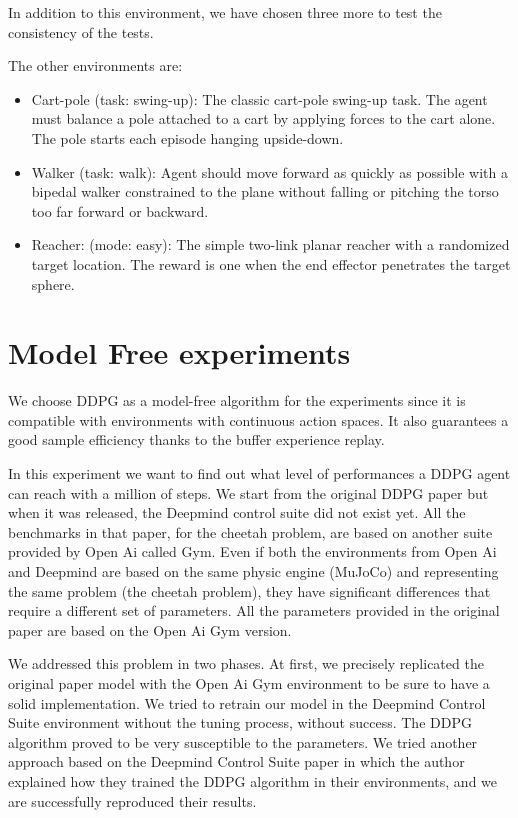In addition to this environment, we have chosen three more to test the consistency of the tests.

The other environments are:
\begin{itemize}
\item Cart-pole (task: swing-up): The classic cart-pole swing-up task. The agent must balance a pole attached to a cart by applying forces to the cart alone. The pole starts each episode hanging upside-down.

\item Walker (task: walk): Agent should move forward as quickly as possible with a bipedal walker constrained to the plane without falling or pitching the torso too far forward or backward.

\item Reacher: (mode: easy): The simple two-link planar reacher with a randomized target location. The reward is one when the end effector penetrates the target sphere.
\end{itemize}



\section{Model Free experiments }
We choose DDPG as a model-free algorithm for the experiments since it is compatible with environments with continuous action spaces. 
It also guarantees a good sample efficiency thanks to the buffer experience replay.

In this experiment we want to find out what level of performances a DDPG agent can reach with a million of steps.
We start from the original DDPG paper \cite{lillicrap2015continuous} but when it was released, the Deepmind control suite did not exist yet.
All the benchmarks in that paper, for the cheetah problem, are based on another suite provided by Open Ai called Gym.
Even if both the environments from Open Ai and Deepmind are based on the same physic engine (MuJoCo) and representing the same problem (the cheetah problem), they have significant differences that require a different set of parameters. 
All the parameters provided in the original paper are based on the Open Ai Gym version.

We addressed this problem in two phases.
At first, we precisely replicated the original paper model with the Open Ai Gym environment to be sure to have a solid implementation. 
We tried to retrain our model in the Deepmind Control Suite environment without the tuning process, without success. 
The DDPG algorithm proved to be very susceptible to the parameters. 
We tried another approach based on the Deepmind Control Suite paper in which the author explained how they trained the DDPG algorithm in their environments, and we are successfully reproduced their results.

